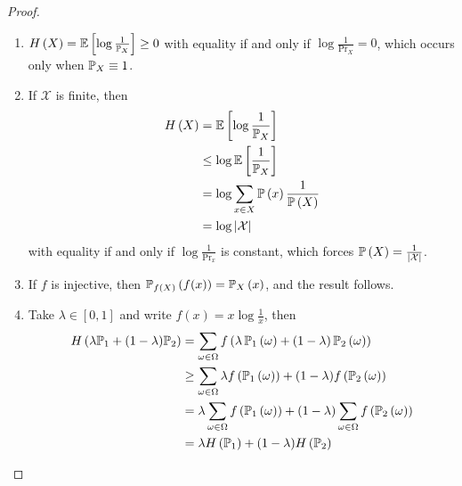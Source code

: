 \begin{proof}\mbox{}
    \begin{enumerate}[label=(\arabic*)]
        \item $\entropy{X} = \expectation{\log\frac{1}{\Pr_X}} \geq 0$
              with equality if and only if $\log\frac{1}{\Pr_X} = 0$, which occurs
              only when $\mathbb{P}_X \equiv 1$.
        \item If $\mathcal{X}$ is finite, then
              \begin{align*}\entropy{X}
                   & = \expectation{\log\frac{1}{\Pr_X}}             \\
                   & \leq \log\expectation{\frac{1}{\Pr_X}}          \\
                   & = \log\sum_{x \in X} \prob{x}\frac{1}{\prob{X}} \\
                   & = \log\card{\mathcal{X}}
              \end{align*}
              with equality if and only if $\log\frac{1}{\Pr_x}$ is constant, which
              forces $\prob{X} = \frac{1}{\card{\mathcal{X}}}$.
        \item If $f$ is injective, then $\prob[f(X)]{f(x)} = \prob[X]{x}$, and
              the result follows.
        \item Take $\lambda \in [0, 1]$ and write $f(x) = x\log\frac{1}{x}$, then
              \begin{align*}\entropy{\lambda\Pr_1 + (1 - \lambda)\Pr_2}
                   & = \sum_{\omega \in \Omega}f\left(\lambda\prob[1]{\omega} + (1 - \lambda)\prob[2]{\omega}\right)                                        \\
                   & \geq \sum_{\omega \in \Omega}\lambda f\left(\prob[1]{\omega}\right) + (1 - \lambda)f\left(\prob[2]{\omega}\right)                      \\
                   & = \lambda\sum_{\omega \in \Omega} f\left(\prob[1]{\omega}\right) + (1 - \lambda)\sum_{\omega \in \Omega}f\left(\prob[2]{\omega}\right) \\
                   & = \lambda \entropy{\Pr_1} + (1 - \lambda)\entropy{\Pr_2}\qedhere
              \end{align*}
    \end{enumerate}
\end{proof}